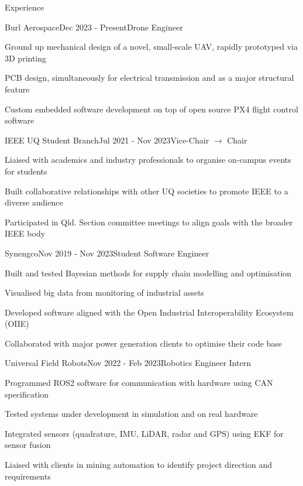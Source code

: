 \documentclass{resume} %
\begin{document}
\vspace{1em}
\begin{rSection}{Experience}

    \begin{rSubsection}{Burl Aerospace}{Dec 2023 - Present}{Drone Engineer}{}
        \item Ground up mechanical design of a novel, small-scale UAV, rapidly prototyped via 3D printing
        \item PCB design, simultaneously for electrical transmission and as a major structural feature
        \item Custom embedded software development on top of open source PX4 flight control software
    \end{rSubsection}

    \begin{rSubsection}{IEEE UQ Student Branch}{Jul 2021 - Nov 2023}{Vice-Chair $\rightarrow$ Chair}{}
        \item Liaised with academics and industry professionals to organise on-campus events for students
        \item Built collaborative relationships with other UQ societies to promote IEEE to a diverse audience
        \item Participated in Qld. Section committee meetings to align goals with the broader IEEE body
    \end{rSubsection}

    \begin{rSubsection}{Synengco}{Nov 2019 - Nov 2023}{Student Software Engineer}{}
        \item Built and tested Bayesian methods for supply chain modelling and optimisation
        \item Visualised big data from monitoring of industrial assets
        \item Developed software aligned with the Open Industrial Interoperability Ecosystem (OIIE)
        \item Collaborated with major power generation clients to optimise their code base
    \end{rSubsection}

\newpage

    \begin{rSubsection}{Universal Field Robots}{Nov 2022 - Feb 2023}{Robotics Engineer Intern}{}
        \item Programmed ROS2 software for communication with hardware using CAN specification
        \item Tested systems under development in simulation and on real hardware
        \item Integrated sensors (quadrature, IMU, LiDAR, radar and GPS) using EKF for sensor fusion
        \item Liaised with clients in mining automation to identify project direction and requirements
    \end{rSubsection}

\end{rSection}
\end{document}
